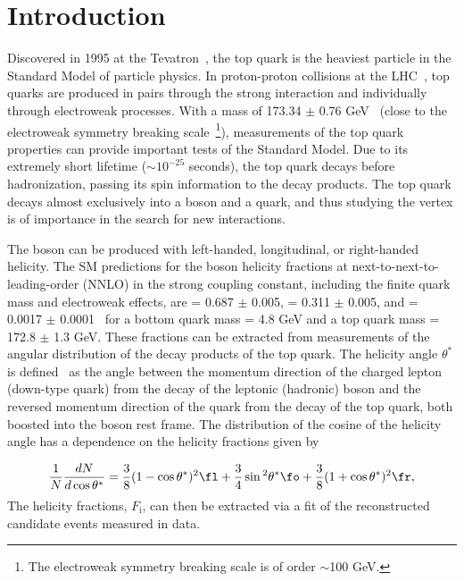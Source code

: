 \section{Introduction}
\label{sec:intro}
Discovered in 1995 at the Tevatron~\cite{CDF, D0}, the top quark is the heaviest particle in the Standard Model of particle physics. In proton-proton collisions at the LHC~\cite{LHC}, top quarks are produced in pairs through the strong interaction and individually through electroweak processes. With a mass of 173.34 $\pm$ 0.76 GeV~\cite{arXiv:1403.4427} 
(close to the electroweak symmetry breaking scale~\cite{Beneke:2000hk}\footnote{The electroweak symmetry breaking scale is of order $\sim$100 GeV.}), measurements of the top quark properties can provide important tests of the Standard Model. Due to its extremely short lifetime (${\sim 10^{-25}}$ seconds), the top quark decays before hadronization, passing its spin information to the decay products. The top quark decays almost exclusively into a \w boson and a \bt quark, and thus studying the \Wtb vertex is of importance in the search for new interactions.

The \w boson can be produced with left-handed, longitudinal, or right-handed helicity. The SM predictions for the \w boson helicity fractions at next-to-next-to-leading-order (NNLO) in the strong coupling constant, including the finite \bt quark mass and electroweak effects, are \fo = 0.687 $\pm$ 0.005, \fl = 0.311 $\pm$ 0.005, and \fr = 0.0017 $\pm$ 0.0001~\cite{nnlo_theory} for a bottom quark mass \mb = 4.8 GeV and a top quark mass \mt = 172.8 $\pm$ 1.3 GeV. These fractions can be extracted from measurements of the angular distribution of the decay products of the top quark. The helicity angle $\theta^{*}$ is defined~\cite{Fischer:1998gsa} as the angle between the momentum direction of the charged lepton (down-type quark) from the decay of the leptonic (hadronic) \w boson and the reversed momentum direction of the \bt quark from the decay of the top quark, both boosted into the \w boson rest frame. The distribution of the cosine of the helicity angle has a dependence on the helicity fractions given by

\begin{equation}
\frac{1}{N}\frac{dN} {d\cos{\theta^{*}}} = \frac{3}{8} (1-\cos{\theta^{*}})^2 \fl +  \frac{3}{4} \sin{^{2}\theta^{*}} \fo +  \frac{3}{8} (1+\cos{\theta^{*}})^2 \fr,
\label{eq:Cos}
\end{equation}
The helicity fractions, $F_{\text{i}}$, can then be extracted via a fit of the reconstructed \ttbar candidate events measured in data.

